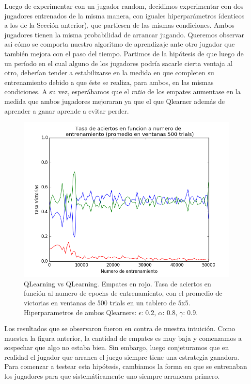 \documentclass[10pt,a4paper]{article}
\begin{document}
Luego de experimentar con un jugador random, decidimos experimentar con dos jugadores entrenados de la misma manera, con iguales hiperparámetros ídenticos a los de la Sección anterior), que partiesen de las mismas condiciones. Ambos jugadores tienen la misma probabilidad de arrancar jugando. Queremos observar así cómo se comporta nuestro algoritmo de aprendizaje ante otro jugador que también mejora con el paso del tiempo. Partimos de la hipótesis de que luego de un período en el cual alguno de los jugadores podría sacarle cierta ventaja al otro, deberían tender a estabilizarse en la medida en que completen su entrenamiento debido a que éste se realiza, para ambos, en las mismas condiciones. A su vez, esperábamos que el \textit{ratio} de los empates aumentase en la medida que ambos jugadores mejoraran ya que el que Qlearner además de aprender a ganar aprende a evitar perder.

\begin{figure}[H]
\centering
\includegraphics[scale=0.6]{images/QlearnervsQlearner50000.png}
\caption{QLearning vs QLearning. Empates en rojo. Tasa de aciertos en función al numero de epochs de entrenamiento, con el promedio de victorias en ventanas de 500 trials en un tablero de 5x5. Hiperparametros de ambos Qlearners: $\epsilon$: 0.2, $\alpha$: 0.8, $\gamma$: 0.9.}
\end{figure}

Los resultados que se observaron fueron en contra de nuestra intuición. Como muestra la figura anterior, la cantidad de empates es muy baja y comenzamos a sospechar que algo no estaba bien. Sin embargo, luego conjeturamos que en realidad el jugador que arranca el juego siempre tiene una estrategia ganadora. Para comenzar a testear esta hipótesis, cambiamos la forma en que se entrenaban los jugadores para que sistemáticamente uno siempre arrancara primero.
\end{document}
